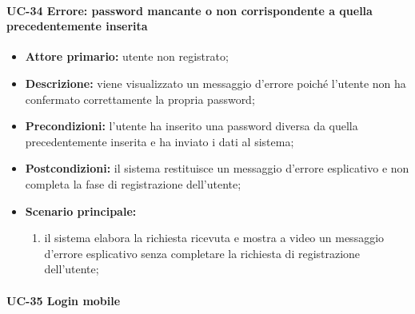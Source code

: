 \paragraph{UC-34 Errore: password mancante o non corrispondente a quella precedentemente inserita}

	\begin{itemize}
		\item \textbf{Attore primario:} utente non registrato;

		\item \textbf{Descrizione:} viene visualizzato un messaggio d'errore poiché l'utente non ha confermato correttamente la propria password;

		\item \textbf{Precondizioni:} l'utente ha inserito una password diversa da quella precedentemente inserita e ha inviato i dati al sistema;

		\item \textbf{Postcondizioni:} il sistema restituisce un messaggio d'errore esplicativo e non completa la fase di registrazione dell'utente;

		\item \textbf{Scenario principale:}
	  		\begin{enumerate}
		  		\item il sistema elabora la richiesta ricevuta e mostra a video un messaggio d'errore esplicativo senza completare la richiesta di registrazione dell'utente; 
	  		\end{enumerate}
	\end{itemize}

\paragraph{UC-35 Login mobile}

